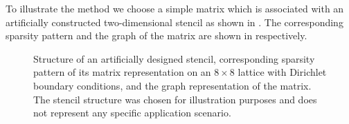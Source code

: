 To illustrate the method we choose a
simple matrix which is associated with an artificially constructed
two-dimensional stencil as shown in . The
corresponding sparsity pattern and the graph of the matrix are shown
in  respectively.
\begin{figure}[t]
	\centering
	\hspace{0.8em}
	\hspace{1em}
	\caption{ Structure of an artificially designed stencil,
	 corresponding sparsity pattern of its matrix
	representation on an $8\times 8$ lattice with Dirichlet
	boundary conditions, and  the graph representation of the
	matrix. The stencil
	structure was chosen for illustration purposes and does not
	represent any specific application scenario.}
	\label{fig:2d-7pt}
\end{figure}

